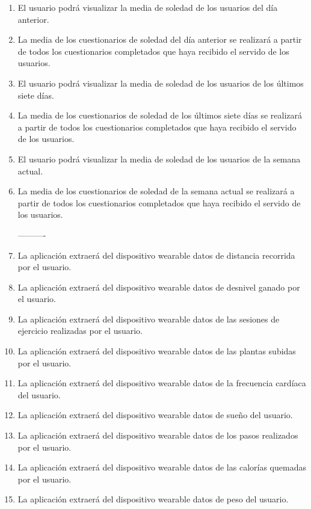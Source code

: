 \begin{enumerate}[label=\textbf{\texttt{RF-\arabic*}}]
            ----------
            \item El usuario podrá visualizar la media de soledad de los usuarios del día anterior.
            \item La media de los cuestionarios de soledad del día anterior se realizará a partir de todos los cuestionarios completados que haya recibido el servido de los usuarios.
            \item El usuario podrá visualizar la media de soledad de los usuarios de los últimos siete días.
            \item La media de los cuestionarios de soledad de los últimos siete días se realizará a partir de todos los cuestionarios completados que haya recibido el servido de los usuarios.
            \item El usuario podrá visualizar la media de soledad de los usuarios de la semana actual.
            \item La media de los cuestionarios de soledad de la semana actual se realizará a partir de todos los cuestionarios completados que haya recibido el servido de los usuarios.
            
            ----------
            \item La aplicación extraerá del dispositivo \gls{wearable} datos de distancia recorrida por el usuario.
            \item La aplicación extraerá del dispositivo \gls{wearable} datos de desnivel ganado por el usuario. 
            \item La aplicación extraerá del dispositivo \gls{wearable} datos de las sesiones de ejercicio realizadas por el usuario.
            \item La aplicación extraerá del dispositivo \gls{wearable} datos de las plantas subidas  por el usuario.
            \item La aplicación extraerá del dispositivo \gls{wearable} datos de la frecuencia cardíaca del usuario.
            \item La aplicación extraerá del dispositivo \gls{wearable} datos de sueño del usuario.
            \item La aplicación extraerá del dispositivo \gls{wearable} datos de los pasos realizados por el usuario.
            \item La aplicación extraerá del dispositivo \gls{wearable} datos de las calorías quemadas por el usuario.
            \item La aplicación extraerá del dispositivo \gls{wearable} datos de peso del usuario.
            

\end{enumerate}
